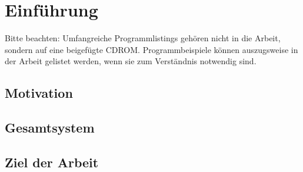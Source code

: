 \chapter{Einf\"uhrung}
Bitte beachten: Umfangreiche Programmlistings geh\"oren nicht in die Arbeit, 
sondern auf eine beigef\"ugte CDROM. Programmbeispiele k\"onnen auszugsweise
in der Arbeit gelistet werden, wenn sie zum Verst\"andnis notwendig sind.

\section{Motivation}
\section{Gesamtsystem}
\section{Ziel der Arbeit}
